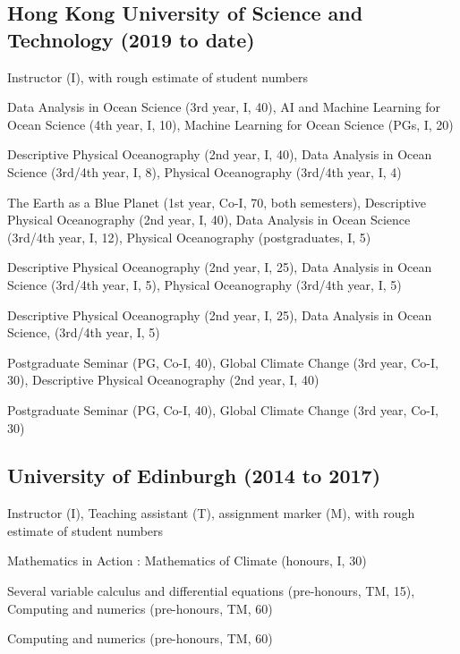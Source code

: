\documentclass[letterpaper]{article}
\renewenvironment{itemize}{
  \begin{list}{}{
    \setlength{\leftmargin}{1.5em}
  }
}{
  \end{list}
}
\begin{document}
\subsection*{Hong Kong University of Science and Technology (2019 to date)}
\begin{itemize}
\item Instructor (I), with rough estimate of student numbers
\begin{itemize}
  \item[25/26:] Data Analysis in Ocean Science (3rd year, I, 40), AI and Machine Learning for Ocean Science (4th year, I, 10), Machine Learning for Ocean Science (PGs, I, 20)
  \item[24/25:] Descriptive Physical Oceanography (2nd year, I, 40), Data Analysis in Ocean Science (3rd/4th year, I, 8), Physical Oceanography (3rd/4th year, I, 4)
  \item[23/24:] The Earth as a Blue Planet (1st year, Co-I, 70, both semesters), Descriptive Physical Oceanography (2nd year, I, 40), Data Analysis in Ocean Science (3rd/4th year, I, 12), Physical Oceanography (postgraduates, I, 5)
  \item[22/23:] Descriptive Physical Oceanography (2nd year, I, 25), Data Analysis in Ocean Science (3rd/4th year, I, 5), Physical Oceanography (3rd/4th year, I, 5)
  \item[21/22:] Descriptive Physical Oceanography (2nd year, I, 25), Data Analysis in Ocean Science, (3rd/4th year, I, 5)
  \item[20/21:] Postgraduate Seminar (PG, Co-I, 40), Global Climate Change (3rd year, Co-I, 30), Descriptive Physical Oceanography (2nd year, I, 40)
  \item[19/20:] Postgraduate Seminar (PG, Co-I, 40), Global Climate Change (3rd year, Co-I, 30)
\end{itemize}
\end{itemize}

\subsection*{University of Edinburgh (2014 to 2017)}
\begin{itemize}
\item Instructor (I), Teaching assistant (T), assignment marker (M), with rough estimate of
student numbers
\begin{itemize}
  \item[16/17:] Mathematics in Action : Mathematics of Climate (honours, I, 30)
	\item[15/16:] Several variable calculus and differential equations
	(pre-honours, TM, 15), Computing and numerics (pre-honours, TM, 60)
	\item[14/15:] Computing and numerics (pre-honours, TM, 60)
\end{itemize}
\end{itemize}
\end{document}
